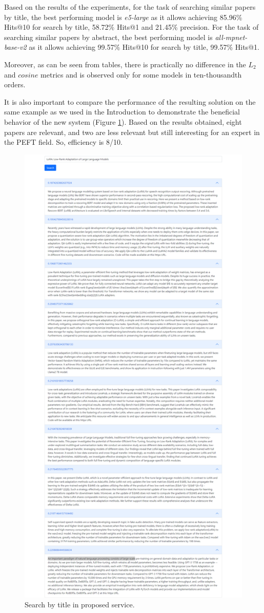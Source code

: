 \documentclass{article}
\begin{document}
        
    
        Based on the results of the experiments, for the task of searching similar papers by title, the best performing model is \textit{e5-large} as it allows achieving 85.96\% Hits@10 for search by title, 58.72\% Hits@1 and 21.45\% precision. For the task of searching similar papers by abstract, the best performing model is \textit{all-mpnet-base-v2} as it allows achieving 99.57\% Hits@10 for search by title, 99.57\% Hits@1.
    
        Moreover, as can be seen from tables, there is practically no difference in the \(L_{2}\) and \(cosine\) metrics and is observed only for some models in ten-thousandth orders.
    
        It is also important to compare the performance of the resulting solution on the same example as we used in the Introduction to demonstrate the beneficial behavior of the new system (Figure \ref{fig:aziri-search}). Based on the results obtained, eight papers are relevant, and two are less relevant but still interesting for an expert in the PEFT field. So, efficiency is 8/10.
    
        \begin{figure}[H]
            \centering
            \includegraphics[width=0.7\linewidth]{img/search_aziri.png}
            \caption{Search by title in proposed service.}
            \label{fig:aziri-search}
        \end{figure}
    
\end{document}
